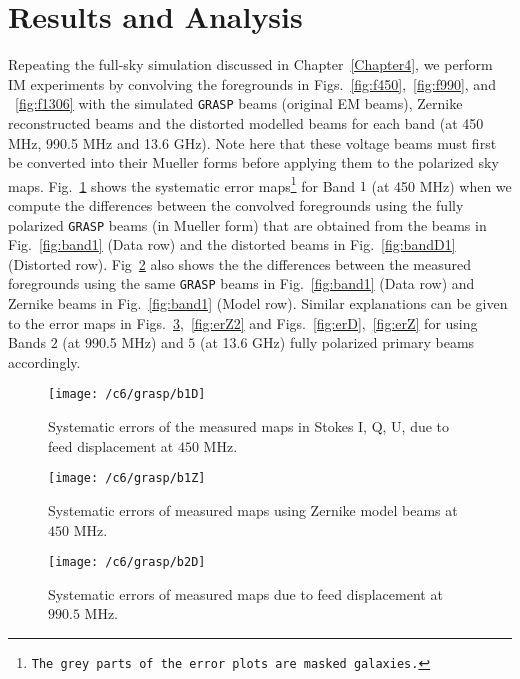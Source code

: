 \section{Results and Analysis} 

Repeating the full-sky simulation discussed in Chapter~\ref{Chapter4}, we perform IM experiments by convolving the foregrounds in 
Figs.~\ref{fig:f450},~\ref{fig:f990}, and ~\ref{fig:f1306} with the simulated {\tt GRASP} beams (original EM beams), Zernike reconstructed beams and the distorted modelled beams 
for each band (at 450 MHz, 990.5 MHz and 13.6 GHz). Note here that these voltage beams must first be converted into  their Mueller forms before applying them to the polarized sky maps.
Fig.~\ref{fig:erD1} shows the systematic error maps\footnote{{\tt The grey parts of the error plots are masked galaxies.}} for Band $1$ (at 450 MHz) when we compute
the differences between the convolved foregrounds using the fully polarized {\tt GRASP} beams (in Mueller form) that are obtained from the beams in Fig.~\ref{fig:band1} (Data row) 
and the distorted beams in Fig.~\ref{fig:bandD1} (Distorted row). Fig~\ref{fig:erZ1} also shows the the differences between the measured foregrounds using the same {\tt GRASP} beams in Fig.~\ref{fig:band1} (Data row) and Zernike beams in Fig.~\ref{fig:band1} (Model row). 
Similar explanations can be given to the error maps in Figs.~\ref{fig:erD2},~\ref{fig:erZ2} and Figs.~\ref{fig:erD},~\ref{fig:erZ} for using Bands $2$ (at 990.5 MHz) and $5$ (at 13.6 GHz) fully polarized primary beams accordingly.

\begin{figure}
\begin{minipage}[H]{\linewidth}
\centering
\texttt{[image: /c6/grasp/b1D]} %
\caption{\label{fig:erD1} Systematic errors of the measured maps in Stokes I, Q, U, due to feed displacement at $450$ MHz.
}
\end{minipage}
\end{figure}
\FloatBarrier

\begin{figure}
\begin{minipage}[H]{\linewidth}
\centering
\texttt{[image: /c6/grasp/b1Z]} %
\caption{\label{fig:erZ1} Systematic errors of measured maps using Zernike model beams at $450$ MHz.}
\end{minipage}
\end{figure}
\FloatBarrier


\begin{figure}
\begin{minipage}[H]{\linewidth}
\centering
\texttt{[image: /c6/grasp/b2D]} %
\caption{\label{fig:erD2} Systematic errors of measured maps due to feed displacement at $990.5$ MHz.}
\end{minipage}
\end{figure}
\FloatBarrier

